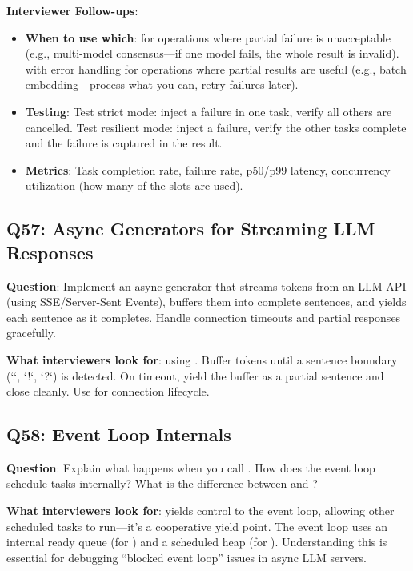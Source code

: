 \textbf{Interviewer Follow-ups}:
\begin{itemize}[leftmargin=*]
    \item \textbf{When to use which}:  for operations where partial failure is unacceptable (e.g., multi-model consensus---if one model fails, the whole result is invalid).  with error handling for operations where partial results are useful (e.g., batch embedding---process what you can, retry failures later).
    \item \textbf{Testing}: Test strict mode: inject a failure in one task, verify all others are cancelled. Test resilient mode: inject a failure, verify the other tasks complete and the failure is captured in the result.
    \item \textbf{Metrics}: Task completion rate, failure rate, p50/p99 latency, concurrency utilization (how many of the  slots are used).
\end{itemize}

\subsection{Q57: Async Generators for Streaming LLM Responses}

\textbf{Question}: Implement an async generator that streams tokens from an LLM API (using SSE/Server-Sent Events), buffers them into complete sentences, and yields each sentence as it completes. Handle connection timeouts and partial responses gracefully.

\textbf{What interviewers look for}:  using . Buffer tokens until a sentence boundary (`.`, `!`, `?`) is detected. On timeout, yield the buffer as a partial sentence and close cleanly. Use  for connection lifecycle.

\subsection{Q58: Event Loop Internals}

\textbf{Question}: Explain what happens when you call . How does the event loop schedule tasks internally? What is the difference between  and ?

\textbf{What interviewers look for}:  yields control to the event loop, allowing other scheduled tasks to run---it's a cooperative yield point. The event loop uses an internal ready queue (for ) and a scheduled heap (for ). Understanding this is essential for debugging ``blocked event loop'' issues in async LLM servers.

